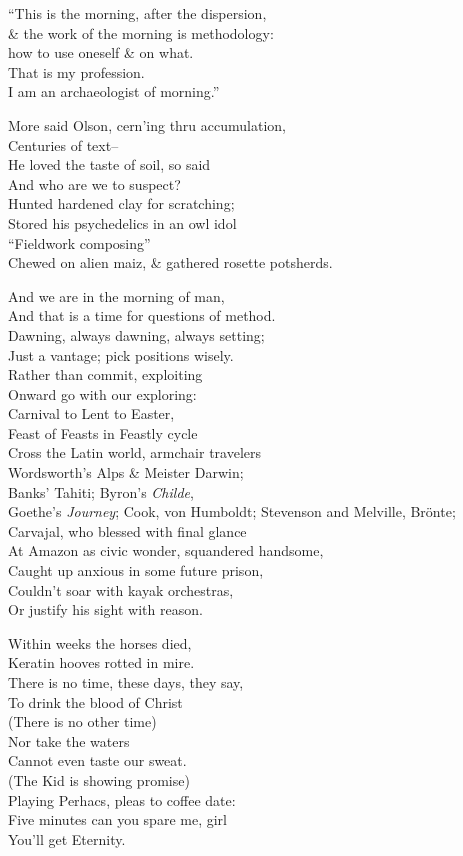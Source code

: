 ``This is the morning, after the dispersion, \\
\& the work of the morning is methodology: \\
how to use oneself \& on what. \\
That is my profession. \\
I am an archaeologist of morning.''

More said Olson, cern'ing thru accumulation, \\
Centuries of text-- \\
He loved the taste of soil, so said \\
And who are we to suspect? \\
Hunted hardened clay for scratching; \\
Stored his psychedelics in an owl idol \\
``Fieldwork composing'' \\
Chewed on alien maiz, \& gathered rosette potsherds.

And we are in the morning of man, \\
And that is a time for questions of method. \\
Dawning, always dawning, always setting; \\
Just a vantage; pick positions wisely. \\
Rather than commit, exploiting \\
Onward go with our exploring: \\
Carnival to Lent to Easter, \\
Feast of Feasts in Feastly cycle \\
Cross the Latin world, armchair travelers \\
Wordsworth's Alps \& Meister Darwin; \\
Banks' Tahiti; Byron's \textit{Childe}, \\
Goethe's \textit{Journey}; Cook, von Humboldt;
Stevenson and Melville, Brönte; \\
Carvajal, who blessed with final glance \\
At Amazon as civic wonder, squandered handsome, \\ 
Caught up anxious in some future prison, \\
Couldn't soar with kayak orchestras, \\
Or justify his sight with reason.

Within weeks the horses died, \\
Keratin hooves rotted in mire. \\
There is no time, these days, they say, \\
To drink the blood of Christ \\
(There is no other time) \\
Nor take the waters \\
Cannot even taste our sweat. \\
(The Kid is showing promise) \\
Playing Perhacs, pleas to coffee date: \\
Five minutes can you spare me, girl \\
You'll get Eternity.

